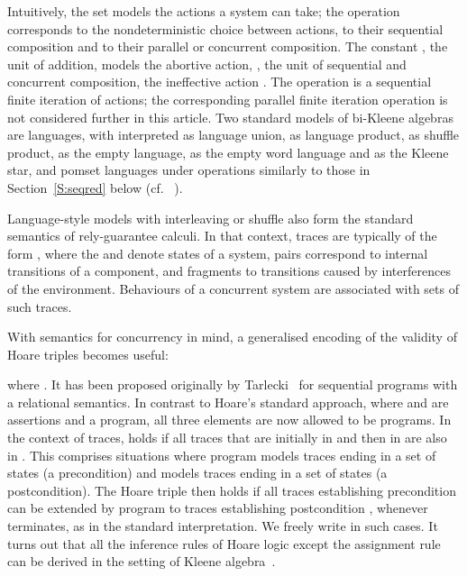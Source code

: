 \documentclass[review]{elsart}
\begin{document}

Intuitively, the set  models the actions a system can take; the operation  corresponds to the nondeterministic choice between actions,  to their sequential composition and  to their parallel or concurrent composition. The constant , the unit of addition, models the abortive action, , the unit of sequential and concurrent composition, the ineffective action . The operation  is a sequential finite iteration of actions; the corresponding parallel finite iteration operation  is not considered further in this article. Two standard models of bi-Kleene algebras are languages, with  interpreted as language union,  as language product,  as shuffle product,  as the empty language,  as the empty word language and  as the Kleene star, and pomset languages under operations similarly to those in Section~\ref{S:seqred} below (cf. ~\cite{BloomEsik}).

Language-style models with interleaving or shuffle also form the standard semantics of rely-guarantee calculi. In that context, traces are typically of the form , where the  and  denote states of a system, pairs  correspond to internal transitions of a component, and fragments  to transitions caused by interferences of the environment. Behaviours of a concurrent system are associated with sets of such traces.

With semantics for concurrency in mind, a generalised encoding of the validity of Hoare triples becomes useful:  

where .  It has been proposed originally by Tarlecki~\cite{Tar85} for sequential programs with a relational semantics. In contrast to Hoare's standard approach, where  and  are assertions and  a program, all three elements are now allowed to be programs. In the context of traces,  holds if all traces that are initially in  and then in  are also in . This comprises situations where program  models traces ending in a set of states  (a precondition) and  models traces ending in a set of states  (a postcondition). The Hoare triple then holds if all traces establishing precondition  can be extended by program  to traces establishing postcondition , whenever  terminates, as in the standard interpretation. We freely write  in such cases. It turns out that all the inference rules of Hoare logic except the assignment rule can be derived in the setting of Kleene algebra~\cite{Hoa11}.
\end{document}
